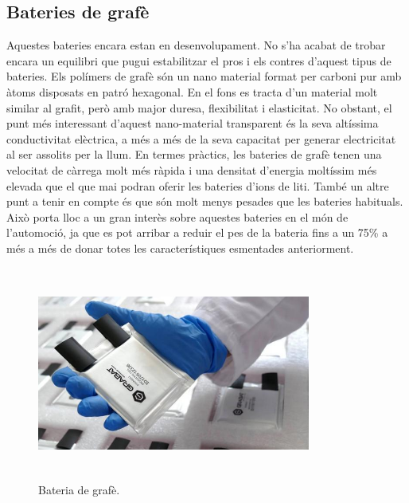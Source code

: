 \subsection{Bateries de grafè}
Aquestes bateries encara estan en desenvolupament. No s’ha acabat de trobar encara un equilibri que pugui estabilitzar el pros i els contres \newline d’aquest tipus de bateries. Els polímers de grafè són un nano material format per carboni pur amb àtoms disposats en patró hexagonal. En el fons es tracta d’un material molt similar al grafit, però amb major duresa, flexibilitat i elasticitat. No obstant, el punt més interessant d’aquest nano-material transparent és la seva altíssima conductivitat elèctrica, a més a més de la seva capacitat per generar electricitat al ser assolits per la llum. 
En termes pràctics, les bateries de grafè tenen una velocitat de càrrega molt més ràpida i una densitat d’energia moltíssim més elevada que el que mai podran oferir les bateries d’ions de liti. També un altre punt a tenir en compte és que són molt menys pesades que les bateries habituals. Això porta lloc a un gran interès sobre aquestes bateries en el món de l’automoció, ja que es pot arribar a reduir el pes de la bateria fins a un 75\% a més a més de donar totes les característiques esmentades anteriorment.
\begin{figure}[H]
	\centering
    \includegraphics[width=9cm, height=7cm] {Bateries/grafeno.jpg}
    \caption{Bateria de grafè.}
\end{figure}                                    

